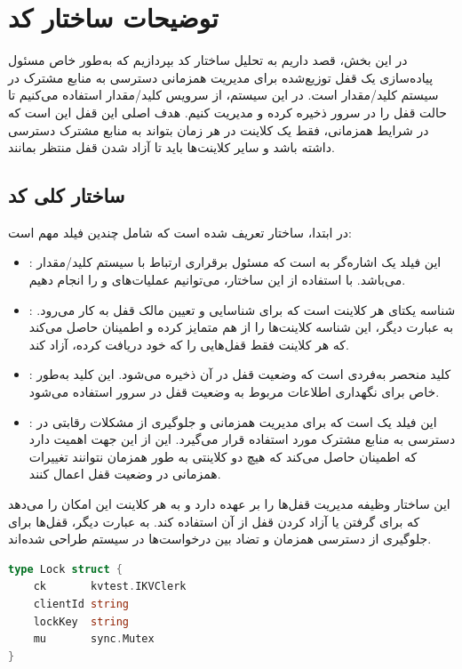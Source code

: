 \section*{توضیحات ساختار کد }

در این بخش، قصد داریم به تحلیل ساختار کد  بپردازیم که به‌طور خاص مسئول پیاده‌سازی یک قفل توزیع‌شده برای مدیریت همزمانی دسترسی به منابع مشترک در سیستم کلید/مقدار است. در این سیستم، از سرویس کلید/مقدار استفاده می‌کنیم تا حالت قفل را در سرور ذخیره کرده و مدیریت کنیم. هدف اصلی این قفل این است که در شرایط همزمانی، فقط یک کلاینت در هر زمان بتواند به منابع مشترک دسترسی داشته باشد و سایر کلاینت‌ها باید تا آزاد شدن قفل منتظر بمانند.

\subsection*{ساختار کلی کد}

در ابتدا، ساختار  تعریف شده است که شامل چندین فیلد مهم است:
\begin{itemize}
  \item {}: این فیلد یک اشاره‌گر به  است که مسئول برقراری ارتباط با سیستم کلید/مقدار می‌باشد. با استفاده از این ساختار، می‌توانیم عملیات‌های  و  را انجام دهیم.
  \item {}: شناسه یکتای هر کلاینت است که برای شناسایی و تعیین مالک قفل به کار می‌رود. به عبارت دیگر، این شناسه کلاینت‌ها را از هم متمایز کرده و اطمینان حاصل می‌کند که هر کلاینت فقط قفل‌هایی را که خود دریافت کرده، آزاد کند.
  \item {}: کلید منحصر به‌فردی است که وضعیت قفل در آن ذخیره می‌شود. این کلید به‌طور خاص برای نگهداری اطلاعات مربوط به وضعیت قفل در سرور استفاده می‌شود.
  \item {}: این فیلد یک  است که برای مدیریت همزمانی و جلوگیری از مشکلات رقابتی در دسترسی به منابع مشترک مورد استفاده قرار می‌گیرد. این  از این جهت اهمیت دارد که اطمینان حاصل می‌کند که هیچ دو کلاینتی به طور همزمان نتوانند تغییرات همزمانی در وضعیت قفل اعمال کنند.
\end{itemize}

این ساختار وظیفه مدیریت قفل‌ها را بر عهده دارد و به هر کلاینت این امکان را می‌دهد که برای گرفتن یا آزاد کردن قفل از آن استفاده کند. به عبارت دیگر، قفل‌ها برای جلوگیری از دسترسی همزمان و تضاد بین درخواست‌ها در سیستم طراحی شده‌اند.

\begin{latin}
\begin{lstlisting}[language=Go]
type Lock struct {
    ck       kvtest.IKVClerk
    clientId string
    lockKey  string
    mu       sync.Mutex
}
\end{lstlisting}
\end{latin}

